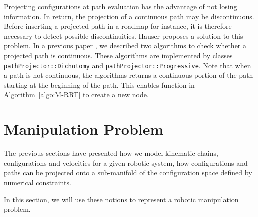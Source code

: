Projecting configurations at path evaluation has the advantage of not losing information. In return, the projection of a continuous path may be discontinuous. Before inserting a projected path in a roadmap for instance, it is therefore necessary to detect possible discontinuities. {\color{blue}Hauser} \cite{Hauser-RSS-13} proposes a solution to this problem. {\color{blue}In a previous paper} \cite{mirabel:hal-01360409}, {\color{blue}we} described two algorithms to check whether a projected path is continuous. These algorithms are implemented by
classes \href{https://gepettoweb.laas.fr/hpp/hpp-core/doxygen-html/classhpp_1_1core_1_1pathProjector_1_1Dichotomy.html}{\texttt{pathProjector::Dichotomy}} and \href{https://gepettoweb.laas.fr/hpp/hpp-core/doxygen-html/classhpp_1_1core_1_1pathProjector_1_1Progressive.html}{\texttt{pathProjector::Progressive}}. {\color{blue} Note that when a path is not continuous, the algorithms returns a continuous portion of the path starting at the beginning of the path. This enables function \EXTEND in Algorithm~\ref{algo:M-RRT} to create a new node.}

\section{Manipulation Problem}\label{sec:manipulation-problem}

The previous sections have presented how we model kinematic chains, configurations and velocities for a given robotic system, how configurations and paths can be projected onto a sub-manifold of the configuration space defined by numerical constraints.

In this section, we will use these notions to represent a robotic manipulation problem.

